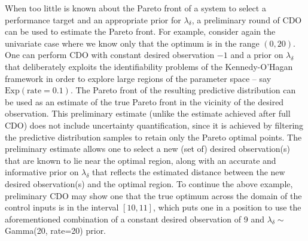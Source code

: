 \documentclass{article}
\begin{document}
When too little is known about the Pareto front of a system to select a performance target and an appropriate prior for $\lambda_\delta$, a preliminary round of CDO can be used to estimate the Pareto front.
%
For example, consider again the univariate case where we know only that the optimum is in the range $(0,20)$. 
%
One can perform CDO with constant desired observation $-1$ and a prior on $\lambda_\delta$ that deliberately exploits the identifiability problems of the Kennedy-O'Hagan framework in order to explore large regions of the parameter space -- say $\mathrm{Exp}(\mathrm{rate}=0.1)$. 
%
The Pareto front of the resulting predictive distribution can be used as an estimate of the true Pareto front in the vicinity of the desired observation.
%
This preliminary estimate (unlike the estimate achieved after full CDO) does not include uncertainty quantification, since it is achieved by filtering the predictive distribution samples to retain only the Pareto optimal points.
%
The preliminary estimate allows one to select a new (set of) desired observation(s) that are known to lie near the optimal region, along with an accurate and informative prior on $\lambda_\delta$ that reflects the estimated distance between the new desired observation(s) and the optimal region.
%
To continue the above example, preliminary CDO may show one that the true optimum across the domain of the control inputs is in the interval $[10,11]$, which puts one in a position to use the aforementioned combination of a constant desired observation of 9 and $\lambda_\delta\sim$Gamma(20, rate=20) prior.
\end{document}
